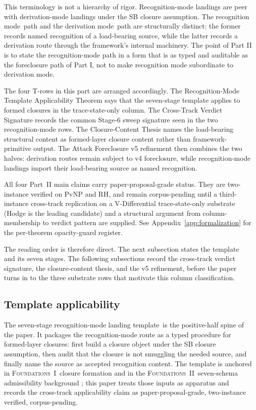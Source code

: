 \documentclass[11pt]{article}
\newcommand{\FOne}{\textsc{Foundations~I}}
\newcommand{\FTwo}{\textsc{Foundations~II}}
\newcommand{\SevenStage}{seven-stage recognition-mode landing template}
\newcommand{\RMmode}{recognition mode}
\newcommand{\DMmode}{derivation mode}
\newcommand{\PPGrade}{paper-proposal-grade}
\newcommand{\TwoInstance}{two-instance verified, corpus-pending}
\theoremstyle{definition}
\begin{document}
This terminology is not a hierarchy of rigor. Recognition-mode landings
are peer with derivation-mode landings under the SB closure assumption.
The \RMmode\ path and the \DMmode\ path are structurally distinct: the
former records named recognition of a load-bearing source, while the
latter records a derivation route through the framework's internal
machinery. The point of Part II is to state the recognition-mode path in a
form that is as typed and auditable as the foreclosure path of Part I, not
to make recognition mode subordinate to derivation mode.

The four T-rows in this part are arranged accordingly. The
Recognition-Mode Template Applicability Theorem says that the seven-stage
template applies to formed closures in the trace-state-only column. The
Cross-Track Verdict Signature records the common Stage-6 sweep signature
seen in the two recognition-mode rows. The Closure-Content Thesis names
the load-bearing structural content as formed-layer closure content rather
than framework-primitive output. The Attack Foreclosure v5 refinement then
combines the two halves: derivation routes remain subject to v4
foreclosure, while recognition-mode landings import their load-bearing
source as named recognition.

All four Part~II main claims carry paper-proposal-grade status.
They are two-instance verified on PvNP and RH, and remain
corpus-pending until a third-instance cross-track replication on a
V-Differential trace-state-only substrate (Hodge is the leading
candidate) and a structural argument from column-membership to
verdict pattern are supplied. See Appendix~\ref{app:formalization} for the per-theorem
opacity-guard register.

The reading order is therefore direct. The next subsection states the
template and its seven stages. The following subsections record the
cross-track verdict signature, the closure-content thesis, and the v5
refinement, before the paper turns in  to the three
substrate rows that motivate this column classification.

\subsection{Template applicability}\label{sec:recognition:template-applicability}

The \SevenStage\ is the positive-half spine of the paper. It packages the
recognition-mode route as a typed procedure for formed-layer closures:
first build a closure object under the SB closure assumption, then audit
that the closure is not smuggling the needed source, and finally name the
source as accepted recognition content. The template is anchored in
\FOne\ closure formation \cite{Tsiokos2026EmergenceCalculus} and in the
\FTwo\ seven-schema admissibility background
\cite{Tsiokos2026FoundationsII}; this paper treats those inputs as
apparatus and records the cross-track applicability claim as
\PPGrade, \TwoInstance.
\end{document}
